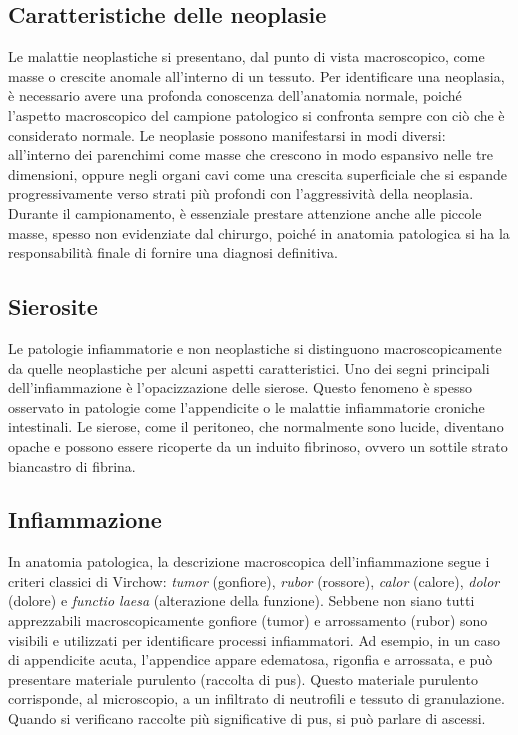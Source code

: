 \subsection{Caratteristiche delle neoplasie}
Le malattie neoplastiche si presentano, dal punto di vista macroscopico, come masse o crescite anomale all'interno di un tessuto. Per identificare una neoplasia, è necessario avere una profonda conoscenza dell'anatomia normale, poiché l’aspetto macroscopico del campione patologico si confronta sempre con ciò che è considerato normale. Le neoplasie possono manifestarsi in modi diversi: all'interno dei parenchimi come masse che crescono in modo espansivo nelle tre dimensioni, oppure negli organi cavi come una crescita superficiale che si espande progressivamente verso strati più profondi con l'aggressività della neoplasia. Durante il campionamento, è essenziale prestare attenzione anche alle piccole masse, spesso non evidenziate dal chirurgo, poiché in anatomia patologica si ha la responsabilità finale di fornire una diagnosi definitiva.

\subsection{Sierosite}
Le patologie infiammatorie e non neoplastiche si distinguono macroscopicamente da quelle neoplastiche per alcuni aspetti caratteristici. Uno dei segni principali dell'infiammazione è l'opacizzazione delle sierose. Questo fenomeno è spesso osservato in patologie come l'appendicite o le malattie infiammatorie croniche intestinali. Le sierose, come il peritoneo, che normalmente sono lucide, diventano opache e possono essere ricoperte da un induito fibrinoso, ovvero un sottile strato biancastro di fibrina.

\subsection{Infiammazione}
In anatomia patologica, la descrizione macroscopica dell'infiammazione segue i criteri classici di Virchow: \textit{tumor} (gonfiore), \textit{rubor} (rossore), \textit{calor} (calore), \textit{dolor} (dolore) e \textit{functio laesa} (alterazione della funzione). Sebbene non siano tutti apprezzabili macroscopicamente  gonfiore (tumor) e arrossamento (rubor) sono visibili e utilizzati per identificare processi infiammatori. Ad esempio, in un caso di appendicite acuta, l'appendice appare edematosa, rigonfia e arrossata, e può presentare materiale purulento (raccolta di pus). Questo materiale purulento corrisponde, al microscopio, a un infiltrato di neutrofili e tessuto di granulazione. Quando si verificano raccolte più significative di pus, si può parlare di ascessi.

